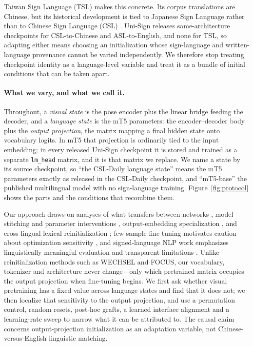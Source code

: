 \documentclass[11pt]{article}
\begin{document}
Taiwan Sign Language (TSL) makes this concrete. Its corpus translations are
Chinese, but its historical development is tied to Japanese Sign Language rather
than to Chinese Sign Language (CSL) \citep{smith2005,fischergong2010,sutai2009,
sasaki2007}. Uni-Sign \citep{unisign} releases same-architecture checkpoints for
CSL-to-Chinese and ASL-to-English, and none for TSL, so adapting either means
choosing an initialization whose sign-language and written-language provenance
cannot be varied independently. We therefore stop treating checkpoint identity as
a language-level variable and treat it as a bundle of initial conditions that can
be taken apart.

\paragraph{What we vary, and what we call it.}
Throughout, a \emph{visual state} is the pose encoder plus the linear bridge
feeding the decoder, and a \emph{language state} is the mT5 parameters: the
encoder--decoder body plus the \emph{output projection}, the matrix mapping a
final hidden state onto vocabulary logits. In mT5 that projection is ordinarily
tied to the input embedding; in every released Uni-Sign checkpoint it is stored
and trained as a separate \texttt{lm\_head} matrix, and it is that matrix we
replace. We name a state by its source checkpoint, so ``the CSL-Daily language
state'' means the mT5 parameters exactly as released in the CSL-Daily
checkpoint, and ``mT5-base'' the published multilingual model with no
sign-language training. Figure~\ref{fig:protocol} shows the parts and the
conditions that recombine them.

Our approach draws on analyses of what transfers between networks
\citep{neyshabur2020transfer}, model stitching and parameter interventions
\citep{bansal2021stitch,taskarith}, output-embedding specialization
\citep{embcoupling}, and cross-lingual lexical reinitialization
\citep{artetxe2020cross,devries2021good,wechsel,focus2023}; few-sample
fine-tuning motivates caution about optimization sensitivity
\citep{zhang2021few}, and signed-language NLP work emphasizes linguistically
meaningful evaluation and transparent limitations \citep{yin2021signed,
mullergloss}. Unlike reinitialization methods such as WECHSEL and FOCUS, our
vocabulary, tokenizer and architecture never change---only which pretrained
matrix occupies the output projection when fine-tuning begins. We first ask
whether visual pretraining has a fixed value across language states and find that
it does not; we then localize that sensitivity to the output projection, and use
a permutation control, random resets, post-hoc grafts, a learned interface
alignment and a learning-rate sweep to narrow what it can be attributed to. The
causal claim concerns output-projection initialization as an adaptation variable,
not Chinese-versus-English linguistic matching.
\end{document}
